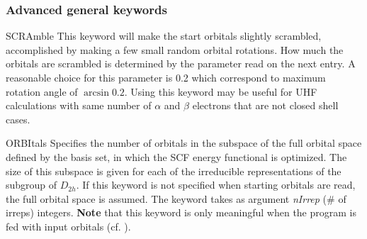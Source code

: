 \subsubsection{Advanced general keywords}
\begin{keywordlist}
\item[SCRAmble]
This keyword will make the start orbitals slightly scrambled,
accomplished by making a few small random orbital rotations.
How much the orbitals are scrambled is determined by the
parameter read on the next entry. A reasonable choice for
this parameter is 0.2 which correspond to maximum rotation angle
of $\arcsin 0.2$.
Using this keyword may be useful for UHF calculations with
same number of $\alpha$ and $\beta$ electrons that are not
closed shell cases.
\item[ORBItals]
Specifies the number of orbitals in the subspace of the full
orbital space defined by the basis set, in which the SCF energy
functional is optimized. The size of this subspace is given for each
of the irreducible representations of the subgroup of $D_{2h}$.
If this keyword is not specified when starting orbitals are read, the
full orbital space is assumed.
The keyword takes as argument {\it nIrrep} (\# of irreps) integers.
{\bf Note} that this keyword is only meaningful when the 
program is fed with input orbitals (cf. ).

\end{keywordlist}
